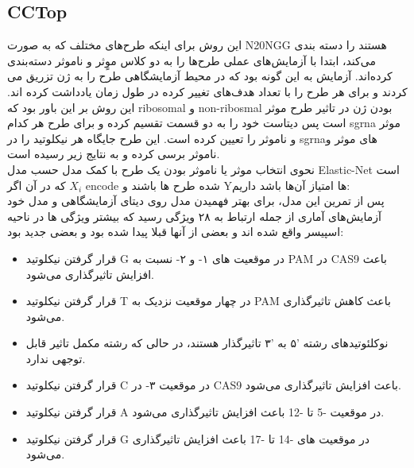 \documentclass[12pt,a4paper,BCOR=.7cm,headsepline,bibliography=totoc]{report}
\begin{document}
\subsection{CCTop~\cite{CCTop}}
این روش برای اینکه طرح‌های مختلف که به صورت N20NGG هستند را دسته بندی می‌کند، ابتدا با آزمایش‌های عملی طرح‌ها را به دو کلاس موٍثر و ناموثر دسته‌بندی کرده‌اند. آزمایش به این گونه بود که در محیط آزمایشگاهی طرح را به ژن تزریق می کردند و برای هر طرح را با تعداد هدف‌های تغییر کرده در طول زمان یادداشت کرده اند. این روش بر این باور بود که ribosomal و non-ribosmal بودن ژن در تاثیر طرح موثر است پس دیتاست خود را به دو قسمت تقسیم کرده و برای طرح هر کدام sgrna موثر و ناموثر را تعیین کرده است. این طرح جایگاه هر نیکلوتید را در sgrnaهای موثر و ناموثر برسی کرده و به نتایج زیر رسیده است.\\
نحوی انتخاب موثر یا ناموثر بودن یک طرح با کمک مدل حسب مدل  Elastic-Net است که در آن اگر
 $X_i$
encode شده طرح ها باشند
و Yها امتیاز آن‌ها باشد داریم:
\\
پس از تمرین این مدل، برای بهتر فهمیدن مدل روی دیتای آزمایشگاهی و مدل خود آزمایش‌های آماری از جمله ارتباط  به ۲۸ ویژگی رسید که بیشتر ویژگی ها در ناحیه اسپیسر واقع شده اند و بعضی از آنها قبلا پیدا شده بود و بعضی جدید بود:
\begin{itemize}
\item
 قرار گرفتن نیکلوتید G در موقعیت های ۱- و ۲- نسبت به PAM در CAS9 باعث افزایش تاثیرگذاری می‌شود.
\item 
قرار گرفتن نیکلوتید T در چهار موقعیت نزدیک به PAM باعث کاهش تاثیرگذاری می‌شود.
\item
  نوکلئوتیدهای رشته '۵ به '۳ تاثیرگذار هستند، در حالی که رشته مکمل تاثیر قابل توجهی ندارد.
\item
قرار گرفتن نیکلوتید C در موقعیت ۳- در CAS9 باعث افزایش تاثیرگذاری می‌شود.
\item
 
قرار گرفتن نیکلوتید A در موقعیت -5 تا -12 باعث افزایش تاثیرگذاری می‌شود.
\item 
قرار گرفتن نیکلوتید G در موقعیت های -14 تا -17 باعث افزایش تاثیرگذاری می‌شود.
\end{itemize}
\end{document}
